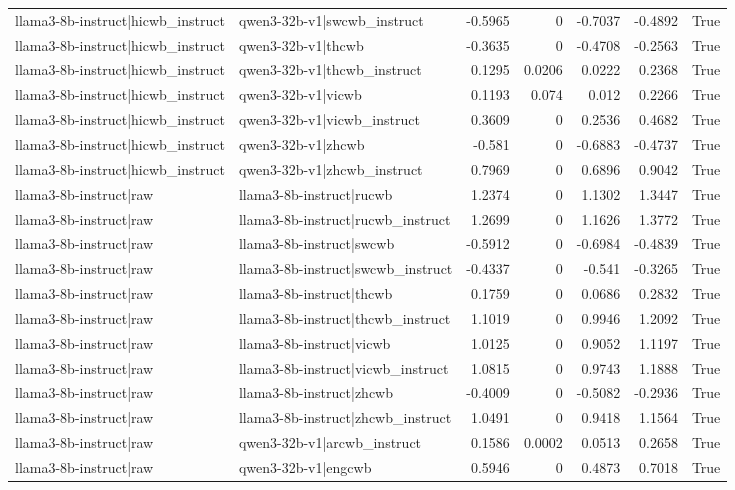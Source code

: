 \begin{table}
\begin{tabular}{l l r r r r l}
llama3-8b-instruct|hicwb_instruct & qwen3-32b-v1|swcwb_instruct & -0.5965 & 0 & -0.7037 & -0.4892 & True \\
llama3-8b-instruct|hicwb_instruct & qwen3-32b-v1|thcwb & -0.3635 & 0 & -0.4708 & -0.2563 & True \\
llama3-8b-instruct|hicwb_instruct & qwen3-32b-v1|thcwb_instruct & 0.1295 & 0.0206 & 0.0222 & 0.2368 & True \\
llama3-8b-instruct|hicwb_instruct & qwen3-32b-v1|vicwb & 0.1193 & 0.074 & 0.012 & 0.2266 & True \\
llama3-8b-instruct|hicwb_instruct & qwen3-32b-v1|vicwb_instruct & 0.3609 & 0 & 0.2536 & 0.4682 & True \\
llama3-8b-instruct|hicwb_instruct & qwen3-32b-v1|zhcwb & -0.581 & 0 & -0.6883 & -0.4737 & True \\
llama3-8b-instruct|hicwb_instruct & qwen3-32b-v1|zhcwb_instruct & 0.7969 & 0 & 0.6896 & 0.9042 & True \\
llama3-8b-instruct|raw & llama3-8b-instruct|rucwb & 1.2374 & 0 & 1.1302 & 1.3447 & True \\
llama3-8b-instruct|raw & llama3-8b-instruct|rucwb_instruct & 1.2699 & 0 & 1.1626 & 1.3772 & True \\
llama3-8b-instruct|raw & llama3-8b-instruct|swcwb & -0.5912 & 0 & -0.6984 & -0.4839 & True \\
llama3-8b-instruct|raw & llama3-8b-instruct|swcwb_instruct & -0.4337 & 0 & -0.541 & -0.3265 & True \\
llama3-8b-instruct|raw & llama3-8b-instruct|thcwb & 0.1759 & 0 & 0.0686 & 0.2832 & True \\
llama3-8b-instruct|raw & llama3-8b-instruct|thcwb_instruct & 1.1019 & 0 & 0.9946 & 1.2092 & True \\
llama3-8b-instruct|raw & llama3-8b-instruct|vicwb & 1.0125 & 0 & 0.9052 & 1.1197 & True \\
llama3-8b-instruct|raw & llama3-8b-instruct|vicwb_instruct & 1.0815 & 0 & 0.9743 & 1.1888 & True \\
llama3-8b-instruct|raw & llama3-8b-instruct|zhcwb & -0.4009 & 0 & -0.5082 & -0.2936 & True \\
llama3-8b-instruct|raw & llama3-8b-instruct|zhcwb_instruct & 1.0491 & 0 & 0.9418 & 1.1564 & True \\
llama3-8b-instruct|raw & qwen3-32b-v1|arcwb_instruct & 0.1586 & 0.0002 & 0.0513 & 0.2658 & True \\
llama3-8b-instruct|raw & qwen3-32b-v1|engcwb & 0.5946 & 0 & 0.4873 & 0.7018 & True \\

\end{tabular}
\end{table}
